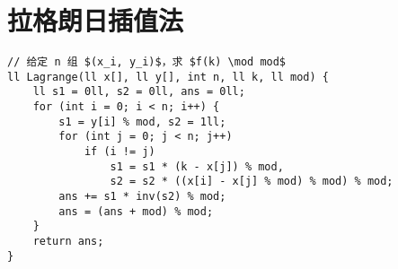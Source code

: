 \section{拉格朗日插值法}

\begin{verbatim}
// 给定 n 组 $(x_i, y_i)$，求 $f(k) \mod mod$
ll Lagrange(ll x[], ll y[], int n, ll k, ll mod) {  
    ll s1 = 0ll, s2 = 0ll, ans = 0ll;  
    for (int i = 0; i < n; i++) {  
        s1 = y[i] % mod, s2 = 1ll;  
        for (int j = 0; j < n; j++)  
            if (i != j)  
                s1 = s1 * (k - x[j]) % mod,  
                s2 = s2 * ((x[i] - x[j] % mod) % mod) % mod;  
        ans += s1 * inv(s2) % mod;  
        ans = (ans + mod) % mod;  
    }  
    return ans;  
} 
\end{verbatim}